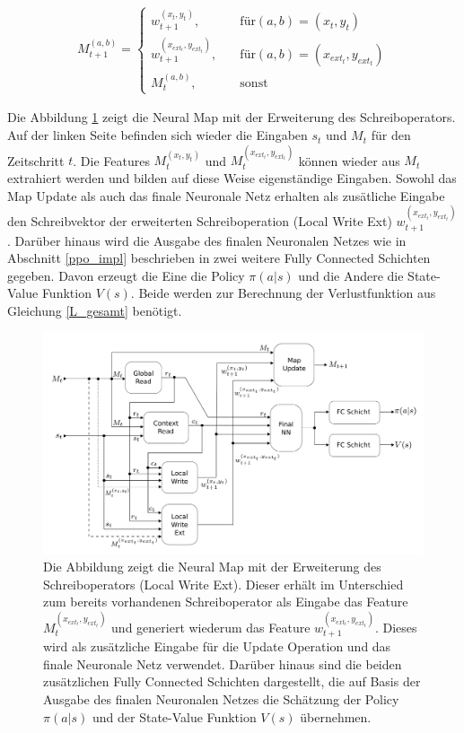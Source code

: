 \begin{equation}
 \begin{aligned}
 M_{t+1}^{(a,b)} =
 \begin{cases}
 w_{t+1}^{(x_t,y_t)}, & \quad \text{für} (a,b) = (x_t,y_t) \\
 w_{t+1}^{(x_{ext_t},y_{ext_t})}, & \quad \text{für} (a,b) = (x_{ext_t},y_{ext_t}) \\
 M_t^{(a,b)}, & \quad \text{sonst}
 \end{cases}
 \end{aligned}
\end{equation}

Die Abbildung \ref{fig_neural_map_extW} zeigt die Neural Map mit der Erweiterung des Schreiboperators. Auf der linken Seite befinden sich wieder die Eingaben $s_t$ und $M_t$ für den Zeitschritt $t$. Die Features $M_t^{(x_t,y_t)}$ und $M_t^{(x_{ext_t},y_{ext_t})}$ können wieder aus $M_t$ extrahiert werden und bilden auf diese Weise eigenständige Eingaben. Sowohl das Map Update als auch das finale Neuronale Netz erhalten als zusätliche Eingabe den Schreibvektor der erweiterten Schreiboperation (Local Write Ext) $w_{t+1}^{(x_{ext_t},y_{ext_t})}$. Darüber hinaus wird die Ausgabe des finalen Neuronalen Netzes wie in Abschnitt \ref{ppo_impl} beschrieben in zwei weitere Fully Connected Schichten gegeben. Davon erzeugt die Eine die Policy $\pi(a|s)$ und die Andere die State-Value Funktion $V(s)$. Beide werden zur Berechnung der Verlustfunktion aus Gleichung \ref{L_gesamt} benötigt.


\begin{figure}[ht!]
  \centering
  \includegraphics[keepaspectratio,width=1.0\textwidth]{abbildungen/neural_map_extW.pdf}
  \caption{Die Abbildung zeigt die Neural Map mit der Erweiterung des Schreiboperators (Local Write Ext). Dieser erhält im Unterschied zum bereits vorhandenen Schreiboperator als Eingabe das Feature $M_t^{(x_{ext_t},y_{ext_t})}$ und generiert wiederum das Feature $w_{t+1}^{(x_{ext_t},y_{ext_t})}$. Dieses wird als zusätzliche Eingabe für die Update Operation und das finale Neuronale Netz verwendet. Darüber hinaus sind die beiden zusätzlichen Fully Connected Schichten dargestellt, die auf Basis der Ausgabe des finalen Neuronalen Netzes die Schätzung der Policy $\pi(a|s)$ und der State-Value Funktion $V(s)$ übernehmen.}
  \label{fig_neural_map_extW}
\end{figure}
